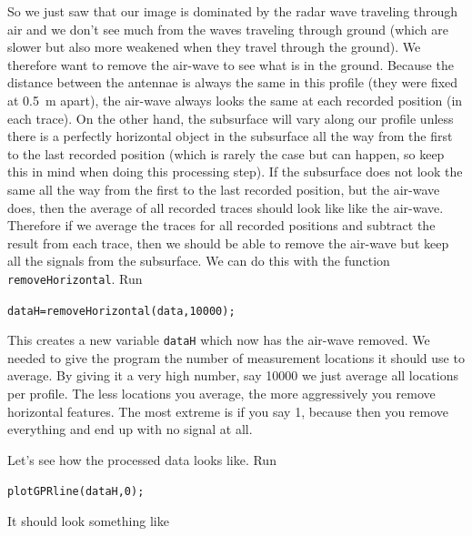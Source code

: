 \documentclass[11pt]{article}
\begin{document}
So we just saw that our image is dominated by the radar wave traveling
through air and we don't see much from the waves traveling through
ground (which are slower but also more weakened when they travel
through the ground). We therefore want to remove the air-wave to see
what is in the ground. Because the distance between the antennae is
always the same in this profile (they were fixed at \SI{0.5}{m}
apart), the air-wave always looks the same at each recorded position
(in each trace). On the other hand, the subsurface will vary along our
profile unless there is a perfectly horizontal object in the
subsurface all the way from the first to the last recorded position
(which is rarely the case but can happen, so keep this in mind when
doing this processing step). If the subsurface does not look the same
all the way from the first to the last recorded position, but the
air-wave does, then the average of all recorded traces should look
like like the air-wave. Therefore if we average the traces for all
recorded positions and subtract the result from each trace, then we
should be able to remove the air-wave but keep all the signals from
the subsurface. We can do this with the function
\verb#removeHorizontal#. Run

\qquad\verb#dataH=removeHorizontal(data,10000);#

This creates a new variable \verb#dataH# which now has the air-wave
removed. We needed to give the program the number of measurement
locations it should use to average. By giving it a very high number,
say \si{10000} we just average all locations per profile. The less
locations you average, the more aggressively you remove horizontal
features. The most extreme is if you say 1, because then you remove
everything and end up with no signal at all.

Let's see how the processed data looks like. Run

\qquad \verb#plotGPRline(dataH,0);#

It should look something like
\end{document}
